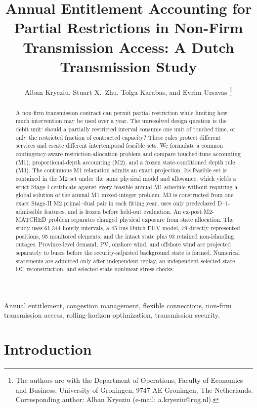 \documentclass[10pt,journal]{IEEEtran}
\title{Annual Entitlement Accounting for Partial Restrictions in Non-Firm Transmission Access: A Dutch Transmission Study}
\author{Alban Kryeziu, Stuart X.~Zhu, Tolga Karabas, and Evrim Ursavas%
\thanks{The authors are with the Department of Operations, Faculty of Economics and Business, University of Groningen, 9747 AE Groningen, The Netherlands. Corresponding author: Alban Kryeziu (e-mail: a.kryeziu@rug.nl).}}
\newif\ifFinalResultsReady
\providecommand{\HeldMTwoS}{--}
\providecommand{\HeldMOneLower}{--}
\providecommand{\HeldMOneUpper}{--}
\providecommand{\HeldCertMargin}{--}
\begin{document}
\maketitle

\begin{abstract}
A non-firm transmission contract can permit partial restriction while limiting how much intervention may be used over a year. The unresolved design question is the debit unit: should a partially restricted interval consume one unit of touched time, or only the restricted fraction of contracted capacity? These rules protect different services and create different intertemporal feasible sets. We formulate a common contingency-aware restriction-allocation problem and compare touched-time accounting (M1), proportional-depth accounting (M2), and a frozen state-conditioned depth rule (M3). The continuous M1 relaxation admits an exact projection. Its feasible set is contained in the M2 set under the same physical model and allowance, which yields a strict Stage-I certificate against every feasible annual M1 schedule without requiring a global solution of the annual M1 mixed-integer problem. M3 is constructed from one exact Stage-II M2 primal--dual pair in each fitting year, uses only predeclared D--1-admissible features, and is frozen before held-out evaluation. An ex-post M2-MATCHED problem separates changed physical exposure from state allocation. The study uses 61,344 hourly intervals, a 45-bus Dutch EHV model, 79 directly represented positions, 95 monitored elements, and the intact state plus 93 retained non-islanding outages. Province-level demand, PV, onshore wind, and offshore wind are projected separately to buses before the security-adjusted background state is formed. Numerical statements are admitted only after independent replay, an independent selected-state DC reconstruction, and selected-state nonlinear stress checks.
\ifFinalResultsReady
Across the held-out years, M2 attains a Stage-I value of \HeldMTwoS\ MW\,h\,row-state while the annual M1 optimum is certified in [\HeldMOneLower,\,\HeldMOneUpper], with a strict margin of \HeldCertMargin.
\fi
\end{abstract}

\begin{IEEEkeywords}
Annual entitlement, congestion management, flexible connections, non-firm transmission access, rolling-horizon optimization, transmission security.
\end{IEEEkeywords}

\section{Introduction}
\label{sec:introduction}
\end{document}
